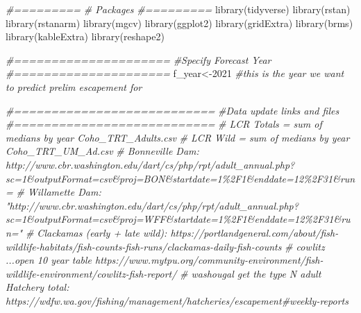 \documentclass[
]{article}
\newenvironment{Shaded}{\begin{snugshade}}{\end{snugshade}}
\newcommand{\CommentTok}[1]{\textcolor[rgb]{0.56,0.35,0.01}{\textit{#1}}}
\newcommand{\DecValTok}[1]{\textcolor[rgb]{0.00,0.00,0.81}{#1}}
\newcommand{\FunctionTok}[1]{\textcolor[rgb]{0.00,0.00,0.00}{#1}}
\newcommand{\NormalTok}[1]{#1}
\newcommand{\OtherTok}[1]{\textcolor[rgb]{0.56,0.35,0.01}{#1}}
\begin{document}
\begin{Shaded}
\begin{Highlighting}[]
\CommentTok{\#=========}
\CommentTok{\# Packages}
\CommentTok{\#=========}
\FunctionTok{library}\NormalTok{(tidyverse)}
\FunctionTok{library}\NormalTok{(rstan)}
\FunctionTok{library}\NormalTok{(rstanarm)}
\FunctionTok{library}\NormalTok{(mgcv)}
\FunctionTok{library}\NormalTok{(ggplot2)}
\FunctionTok{library}\NormalTok{(gridExtra)}
\FunctionTok{library}\NormalTok{(brms)}
\FunctionTok{library}\NormalTok{(kableExtra)}
\FunctionTok{library}\NormalTok{(reshape2)}


\CommentTok{\#=====================}
\CommentTok{\#Specify Forecast Year}
\CommentTok{\#=====================}
\NormalTok{f\_year}\OtherTok{\textless{}{-}}\DecValTok{2021} \CommentTok{\#this is the year we want to predict prelim escapement for}

\CommentTok{\#===========================}
\CommentTok{\#Data update links and files}
\CommentTok{\#===========================}
\CommentTok{\# LCR Totals = sum of medians by year Coho\_TRT\_Adults.csv}
\CommentTok{\# LCR Wild = sum of medians by year Coho\_TRT\_UM\_Ad.csv}
\CommentTok{\# Bonneville Dam: http://www.cbr.washington.edu/dart/cs/php/rpt/adult\_annual.php?sc=1\&outputFormat=csv\&proj=BON\&startdate=1\%2F1\&enddate=12\%2F31\&run=}
\CommentTok{\# Willamette Dam: "http://www.cbr.washington.edu/dart/cs/php/rpt/adult\_annual.php?sc=1\&outputFormat=csv\&proj=WFF\&startdate=1\%2F1\&enddate=12\%2F31\&run="}
\CommentTok{\# Clackamas (early + late wild): https://portlandgeneral.com/about/fish{-}wildlife{-}habitats/fish{-}counts{-}fish{-}runs/clackamas{-}daily{-}fish{-}counts}
\CommentTok{\# cowlitz ...open 10 year table https://www.mytpu.org/community{-}environment/fish{-}wildlife{-}environment/cowlitz{-}fish{-}report/}
\CommentTok{\# washougal get the type N adult Hatchery total: https://wdfw.wa.gov/fishing/management/hatcheries/escapement\#weekly{-}reports}


\end{Highlighting}
\end{Shaded}
\end{document}
